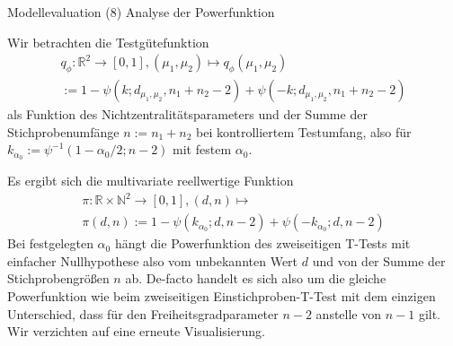 \documentclass[
  8pt,
  ignorenonframetext,
]{beamer}
\begin{document}
\begin{frame}{Modellevaluation}
\protect\hypertarget{modellevaluation-36}{}
\noindent (8) Analyse der Powerfunktion

\small

Wir betrachten die Testgütefunktion \begin{multline}
q_{\phi} : \mathbb{R}^2 \to [0,1],
(\mu_1, \mu_2) \mapsto q_{\phi}(\mu_1, \mu_2)
\\ := 1 - \psi(k;d_{\mu_1,\mu_2},n_1+n_2-2) + \psi(-k;d_{\mu_1,\mu_2},n_1+n_2-2)
\end{multline} als Funktion des Nichtzentralitätsparameters und der
Summe der Stichprobenumfänge \(n := n_1 + n_2\) bei kontrolliertem
Testumfang, also für \(k_{\alpha_0} := \psi^{-1}(1-\alpha_0/2;n-2)\) mit
festem \(\alpha_0\).

Es ergibt sich die multivariate reellwertige Funktion \begin{multline}
\pi : \mathbb{R} \times \mathbb{N}^2 \to [0,1],
(d,n) \mapsto
\\ \pi(d,n) := 1-\psi(k_{\alpha_0};d,n-2)+\psi(-k_{\alpha_0}; d,n-2)
\end{multline} Bei festgelegten \(\alpha_0\) hängt die Powerfunktion des
zweiseitigen T-Tests mit einfacher Nullhypothese also vom unbekannten
Wert \(d\) und von der Summe der Stichprobengrößen \(n\) ab. De-facto
handelt es sich also um die gleiche Powerfunktion wie beim zweiseitigen
Einstichproben-T-Test mit dem einzigen Unterschied, dass für den
Freiheitsgradparameter \(n-2\) anstelle von \(n-1\) gilt. Wir verzichten
auf eine erneute Visualisierung. \vfill
\end{frame}
\end{document}
